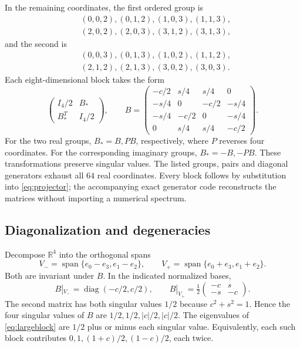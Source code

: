\documentclass[11pt,a4paper]{article}
\newcommand{\R}{\mathbb R}
\DeclareMathOperator{\diag}{diag}
\begin{document}
In the remaining coordinates, the first ordered group is
\begin{align*}
 &(0,0,2),(0,1,2),(1,0,3),(1,1,3),\\
 &(2,0,2),(2,0,3),(3,1,2),(3,1,3),
\end{align*}
and the second is
\begin{align*}
 &(0,0,3),(0,1,3),(1,0,2),(1,1,2),\\
 &(2,1,2),(2,1,3),(3,0,2),(3,0,3).
\end{align*}
Each eight-dimensional block takes the form
\begin{equation}
 \begin{pmatrix}I_4/2&B_*\\B_*^T&I_4/2\end{pmatrix},\qquad
 B=\begin{pmatrix}
 -c/2&s/4&s/4&0\\
 -s/4&0&-c/2&-s/4\\
 -s/4&-c/2&0&-s/4\\
 0&s/4&s/4&-c/2
 \end{pmatrix}.
 \label{eq:largeblock}
\end{equation}
For the two real groups, $B_*=B,PB$, respectively, where $P$ reverses four coordinates. For the corresponding imaginary groups, $B_*=-B,-PB$. These transformations preserve singular values. The listed groups, pairs and diagonal generators exhaust all $64$ real coordinates. Every block follows by substitution into \eqref{eq:projector}; the accompanying exact generator code reconstructs the matrices without importing a numerical spectrum.

\subsection{Diagonalization and degeneracies}

Decompose $\R^4$ into the orthogonal spans
\begin{equation}
 V_- =\operatorname{span}\{e_0-e_3,e_1-e_2\},\qquad
 V_+ =\operatorname{span}\{e_0+e_3,e_1+e_2\}.
\end{equation}
Both are invariant under $B$. In the indicated normalized bases,
\begin{equation}
 B|_{V_-}=\diag(-c/2,c/2),\qquad
 B|_{V_+}=\tfrac12\begin{pmatrix}-c&s\\-s&-c\end{pmatrix}.
 \label{eq:Bsplit}
\end{equation}
The second matrix has both singular values $1/2$ because $c^2+s^2=1$. Hence the four singular values of $B$ are $1/2,1/2,|c|/2,|c|/2$. The eigenvalues of \eqref{eq:largeblock} are $1/2$ plus or minus each singular value. Equivalently, each such block contributes $0,1,(1+c)/2,(1-c)/2$, each twice.
\end{document}
